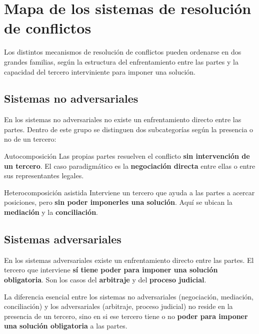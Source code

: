 \documentclass[12pt,oneside]{book}
\begin{document}
\section{Mapa de los sistemas de resoluci\'on de conflictos}

Los distintos mecanismos de resolución de conflictos pueden ordenarse
en dos grandes familias, según la estructura del enfrentamiento entre
las partes y la capacidad del tercero interviniente para imponer una
solución.

\subsection{Sistemas no adversariales}

En los sistemas no adversariales no existe un enfrentamiento directo
entre las partes. Dentro de este grupo se distinguen dos subcategorías
según la presencia o no de un tercero:

\begin{definition}{Autocomposici\'on}
Las propias partes resuelven el conflicto \textbf{sin intervención de
un tercero}. El caso paradigmático es la \textbf{negociación directa}
entre ellas o entre sus representantes legales.
\end{definition}

\begin{definition}{Heterocomposici\'on asistida}
Interviene un tercero que ayuda a las partes a acercar posiciones,
pero \textbf{sin poder imponerles una solución}. Aquí se ubican la
\textbf{mediación} y la \textbf{conciliación}.
\end{definition}

\subsection{Sistemas adversariales}

En los sistemas adversariales existe un enfrentamiento directo entre
las partes. El tercero que interviene \textbf{sí tiene poder para
imponer una solución obligatoria}. Son los casos del \textbf{arbitraje}
y del \textbf{proceso judicial}.

\begin{important}
La diferencia esencial entre los sistemas no adversariales
(negociación, mediación, conciliación) y los adversariales
(arbitraje, proceso judicial) no reside en la presencia de un tercero,
sino en si ese tercero tiene o no \textbf{poder para imponer una
solución obligatoria} a las partes.
\end{important}
\end{document}

